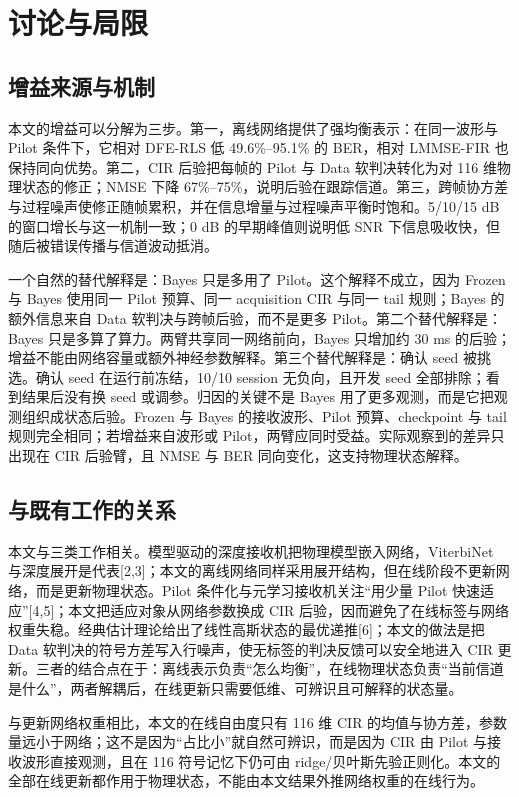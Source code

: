 \section{讨论与局限}

\subsection{增益来源与机制}

本文的增益可以分解为三步。第一，离线网络提供了强均衡表示：在同一波形与 Pilot 条件下，它相对 DFE-RLS 低 49.6\%–95.1\% 的 BER，相对 LMMSE-FIR 也保持同向优势。第二，CIR 后验把每帧的 Pilot 与 Data 软判决转化为对 116 维物理状态的修正；NMSE 下降 67\%–75\%，说明后验在跟踪信道。第三，跨帧协方差与过程噪声使修正随帧累积，并在信息增量与过程噪声平衡时饱和。5/10/15 dB 的窗口增长与这一机制一致；0 dB 的早期峰值则说明低 SNR 下信息吸收快，但随后被错误传播与信道波动抵消。

一个自然的替代解释是：Bayes 只是多用了 Pilot。这个解释不成立，因为 Frozen 与 Bayes 使用同一 Pilot 预算、同一 acquisition CIR 与同一 tail 规则；Bayes 的额外信息来自 Data 软判决与跨帧后验，而不是更多 Pilot。第二个替代解释是：Bayes 只是多算了算力。两臂共享同一网络前向，Bayes 只增加约 30 ms 的后验；增益不能由网络容量或额外神经参数解释。第三个替代解释是：确认 seed 被挑选。确认 seed 在运行前冻结，10/10 session 无负向，且开发 seed 全部排除；看到结果后没有换 seed 或调参。归因的关键不是 Bayes 用了更多观测，而是它把观测组织成状态后验。Frozen 与 Bayes 的接收波形、Pilot 预算、checkpoint 与 tail 规则完全相同；若增益来自波形或 Pilot，两臂应同时受益。实际观察到的差异只出现在 CIR 后验臂，且 NMSE 与 BER 同向变化，这支持物理状态解释。

\subsection{与既有工作的关系}

本文与三类工作相关。模型驱动的深度接收机把物理模型嵌入网络，ViterbiNet 与深度展开是代表[2,3]；本文的离线网络同样采用展开结构，但在线阶段不更新网络，而是更新物理状态。Pilot 条件化与元学习接收机关注“用少量 Pilot 快速适应”[4,5]；本文把适应对象从网络参数换成 CIR 后验，因而避免了在线标签与网络权重失稳。经典估计理论给出了线性高斯状态的最优递推[6]；本文的做法是把 Data 软判决的符号方差写入行噪声，使无标签的判决反馈可以安全地进入 CIR 更新。三者的结合点在于：离线表示负责“怎么均衡”，在线物理状态负责“当前信道是什么”，两者解耦后，在线更新只需要低维、可辨识且可解释的状态量。

与更新网络权重相比，本文的在线自由度只有 116 维 CIR 的均值与协方差，参数量远小于网络；这不是因为“占比小”就自然可辨识，而是因为 CIR 由 Pilot 与接收波形直接观测，且在 116 符号记忆下仍可由 ridge/贝叶斯先验正则化。本文的全部在线更新都作用于物理状态，不能由本文结果外推网络权重的在线行为。

